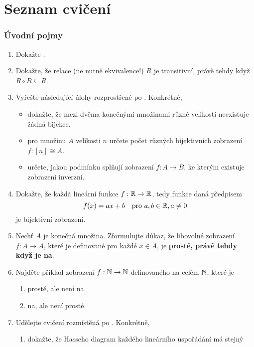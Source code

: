 \section*{Seznam cvičení}
\label{sec:seznam-cviceni}


\subsubsection*{Úvodní pojmy}

\begin{enumerate}
 \item Dokažte .
 \item Dokažte, že relace (ne nutně ekvivalence!) $R$ je transitivní, právě
  tehdy když $R \circ R \subseteq R$.
 \item Vyřešte následující úlohy rozprostřené po .
  Konkrétně,
  \begin{itemize}
   \item dokažte, že mezi dvěma konečnými množinami
   různé velikosti neexistuje žádná bijekce.
   \item pro množinu $A$ velikosti $n$ určete počet různých bijektivních
    zobrazení ${f:[n] \cong A}$. \item určete, jakou podmínku splňují zobrazení
    $f:A \to B$, ke kterým existuje zobrazení inverzní.
  \end{itemize}
 \item Dokažte, že každá lineární funkce $f:\mathbb{R} \to \mathbb{R}$, tedy funkce daná
  předpisem
  \[
   f(x) = ax + b \quad \text{pro } a,b \in \mathbb{R},a \neq 0
  \]
  je bijektivní zobrazení.
 \item Nechť $A$ je konečná množina. Zformulujte důkaz, že libovolné zobrazení
  ${f:A \to A}$, které je definované pro každé $x \in A$, je \textbf{prosté,
  právě tehdy když je na}.
 \item Najděte příklad zobrazení $f:\mathbb{N} \to \mathbb{N}$ definovaného na celém $\mathbb{N}$, které
  je
 \begin{enumerate}
  \item prosté, ale není na.
  \item na, ale není prosté.
 \end{enumerate}
 \item Udělejte cvičení rozmístěná po . Konkrétně,
  \begin{enumerate}
   \item dokažte, že Hasseho diagram každého lineárního uspořádání má stejný

\end{enumerate}
\end{enumerate}
